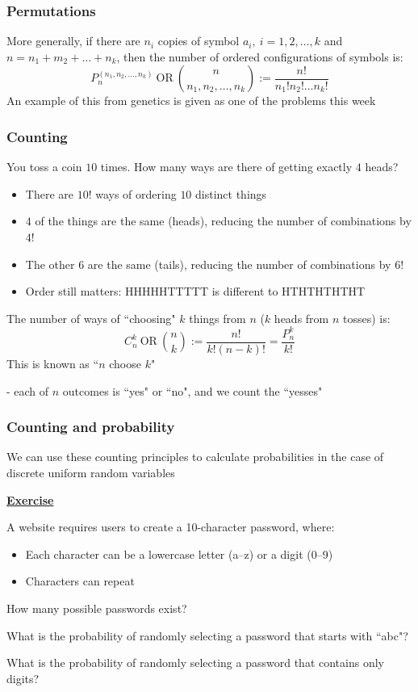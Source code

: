 \documentclass[t,8pt]{beamer}%
\begin{document}
    \begin{frame}
	\frametitle{Permutations}
	More generally, if there are $n_i$ copies of symbol $a_i,\ i=1,2,\dots,k$ and $n=n_1+m_2+\dots+n_k$, then the number of ordered configurations of symbols is:
    $$
    P_n^{(n_1,n_2,\dots,n_k)}\ \text{OR}\ {n\choose {n_1,n_2,\dots,n_k}}:=\frac{n!}{n_1!n_2!\dots n_k!}
    $$
    An example of this from genetics is given as one of the problems this week
    \end{frame}

    \begin{frame}
	\frametitle{Counting}
	You toss a coin $10$ times. How many ways are there of getting exactly $4$ heads?
    \begin{itemize}
        \item There are $10!$ ways of ordering $10$ distinct things
        \item $4$ of the things are the same (heads), reducing the number of combinations by $4!$
        \item The other $6$ are the same (tails), reducing the number of combinations by $6!$
        \item Order still matters: HHHHHTTTTT is different to HTHTHTHTHT
    \end{itemize}
    The number of ways of ``choosing" $k$ things from $n$ ($k$ heads from $n$ tosses) is:
    $$C_n^k\ \text{OR}\ {n\choose k}:=\frac{n!}{k!(n-k)!}=\frac{P_n^k}{k!}$$
    This is known as ``$n$ choose $k$" \par
    {\small\color{NavyBlue} - each of $n$ outcomes is ``yes" or ``no", and we count the ``yesses"} \par
    \end{frame}

    \begin{frame}
		\frametitle{Counting and probability}
        We can use these counting principles to calculate probabilities in the case of discrete uniform random variables \par
        {\bf\underline{Exercise}} \par
        A website requires users to create a 10-character password, where:
        \begin{itemize}
            \item Each character can be a lowercase letter (a–z) or a digit (0–9)
            \item Characters can repeat
        \end{itemize}
        How many possible passwords exist? \par
        What is the probability of randomly selecting a password that starts with ``abc"? \par
        What is the probability of randomly selecting a password that contains only digits? \par
    \end{frame}
\end{document}
